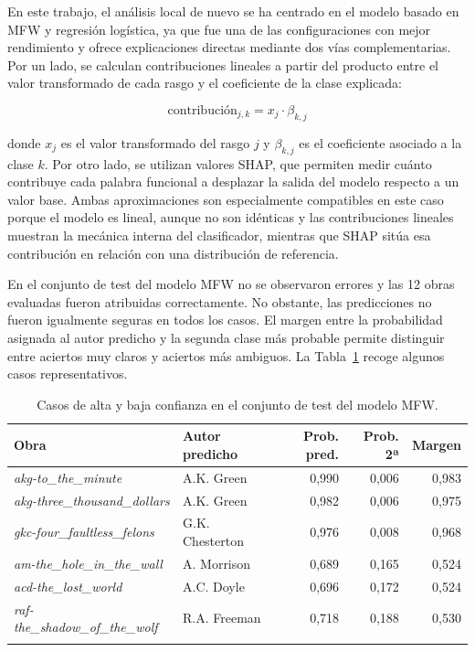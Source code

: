 \documentclass[IB]{TFUOC}%
\begin{document}
En este trabajo, el análisis local de nuevo se ha centrado en el modelo basado en MFW y regresión logística, ya que fue una de las configuraciones con mejor rendimiento y ofrece explicaciones directas mediante dos vías complementarias. Por un lado, se calculan contribuciones lineales a partir del producto entre el valor transformado de cada rasgo y el coeficiente de la clase explicada:

$$\text{contribución}_{j,k} = x_j \cdot \beta_{k,j}$$

donde $x_j$ es el valor transformado del rasgo $j$ y $\beta_{k,j}$ es el coeficiente asociado a la clase $k$. Por otro lado, se utilizan valores SHAP, que permiten medir cuánto contribuye cada palabra funcional a desplazar la salida del modelo respecto a un valor base. Ambas aproximaciones son especialmente compatibles en este caso porque el modelo es lineal, aunque no son idénticas y las contribuciones lineales muestran la mecánica interna del clasificador, mientras que SHAP sitúa esa contribución en relación con una distribución de referencia.

En el conjunto de test del modelo MFW no se observaron errores y las 12 obras evaluadas fueron atribuidas correctamente. No obstante, las predicciones no fueron igualmente seguras en todos los casos. El margen entre la probabilidad asignada al autor predicho y la segunda clase más probable permite distinguir entre aciertos muy claros y aciertos más ambiguos. La Tabla~\ref{tab:predicciones-locales-casos} recoge algunos casos representativos.

\begin{longtable}{|p{5.4cm}|p{3.3cm}|r|r|r|}
\hline
\textbf{Obra} & \textbf{Autor predicho} & \textbf{Prob. pred.} & \textbf{Prob. 2ª} & \textbf{Margen} \\
\hline
\textit{akg-to\_the\_minute} & A.K. Green & 0,990 & 0,006 & 0,983 \\
\hline
\textit{akg-three\_thousand\_dollars} & A.K. Green & 0,982 & 0,006 & 0,975 \\
\hline
\textit{gkc-four\_faultless\_felons} & G.K. Chesterton & 0,976 & 0,008 & 0,968 \\
\hline
\textit{am-the\_hole\_in\_the\_wall} & A. Morrison & 0,689 & 0,165 & 0,524 \\
\hline
\textit{acd-the\_lost\_world} & A.C. Doyle & 0,696 & 0,172 & 0,524 \\
\hline
\textit{raf-the\_shadow\_of\_the\_wolf} & R.A. Freeman & 0,718 & 0,188 & 0,530 \\
\hline
\caption{Casos de alta y baja confianza en el conjunto de test del modelo MFW.}
\label{tab:predicciones-locales-casos}
\end{longtable}
\end{document}
